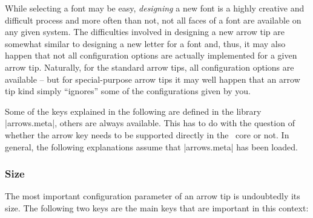 While selecting a font may be easy, \emph{designing} a new font is a
highly creative and difficult process and more often than not, not all
faces of a font are available on any given system. The difficulties
involved in designing a new arrow tip are somewhat similar to designing a new
letter for a font and, thus, it may also happen that not all
configuration options are actually implemented for a given arrow
tip. Naturally, for the standard arrow tips, all configuration options
are available -- but for special-purpose arrow tips it may well happen
that an arrow tip kind simply ``ignores'' some of the configurations
given by you.

Some of the keys explained in the following are defined in the library
|arrows.meta|, others are always available. This has to do with the
question of whether the arrow key needs to be supported directly in the
\pgfname\ core or not. In general, the following explanations assume
that |arrows.meta| has been loaded.


\subsubsection{Size}

The most important configuration parameter of an arrow tip is
undoubtedly its size. The following two keys are the main keys that
are important in this context:

